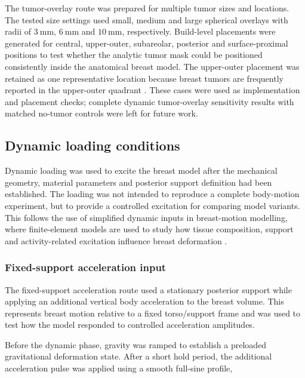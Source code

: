 The tumor-overlay route was prepared for multiple tumor sizes and locations. The tested size settings used small, medium and large spherical overlays with radii of $3~\mathrm{mm}$, $6~\mathrm{mm}$ and $10~\mathrm{mm}$, respectively. Build-level placements were generated for central, upper-outer, subareolar, posterior and surface-proximal positions to test whether the analytic tumor mask could be positioned consistently inside the anatomical breast model. The upper-outer placement was retained as one representative location because breast tumors are frequently reported in the upper-outer quadrant \cite{Rummel2015}. These cases were used as implementation and placement checks; complete dynamic tumor-overlay sensitivity results with matched no-tumor controls were left for future work.




\subsection{Dynamic loading conditions}
\label{dynamic_loading_conditions}

Dynamic loading was used to excite the breast model after the mechanical geometry, material parameters and posterior support definition had been established. The loading was not intended to reproduce a complete body-motion experiment, but to provide a controlled excitation for comparing model variants. This follows the use of simplified dynamic inputs in breast-motion modelling, where finite-element models are used to study how tissue composition, support and activity-related excitation influence breast deformation \cite{Chen2025,Teixeira2023}.

\subsubsection{Fixed-support acceleration input}
\label{fixed_support_acceleration_input}

The fixed-support acceleration route used a stationary posterior support while applying an additional vertical body acceleration to the breast volume. This represents breast motion relative to a fixed torso/support frame and was used to test how the model responded to controlled acceleration amplitudes.

Before the dynamic phase, gravity was ramped to establish a preloaded gravitational deformation state. After a short hold period, the additional acceleration pulse was applied using a smooth full-sine profile,


